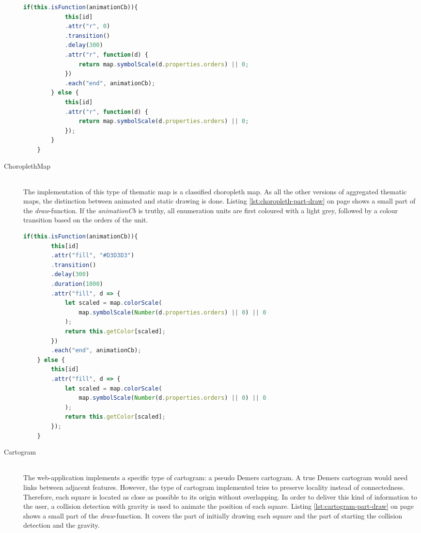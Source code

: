 \begin{description}
\begin{lstlisting}[language=JavaScript, caption={The draw-function of the ProportionalSymbolMap-class}, label={lst:psm-draw}]
        if(this.isFunction(animationCb)){
            this[id]
            .attr("r", 0)
            .transition()
            .delay(300)
            .attr("r", function(d) {
                return map.symbolScale(d.properties.orders) || 0;
            })
            .each("end", animationCb);
        } else {
            this[id]
            .attr("r", function(d) {
                return map.symbolScale(d.properties.orders) || 0;
            });
        }
    }
\end{lstlisting}

\item[ChoroplethMap] \hfill \\
The implementation of this type of thematic map is a classified choropleth map. As all the other versions of aggregated thematic maps, the distinction between animated and static drawing is done. Listing \ref{lst:choropleth-part-draw} on page \pageref{lst:choropleth-part-draw} shows a small part of the \textit{draw}-function. If the \textit{animationCb} is truthy, all enumeration units are first coloured with a light grey, followed by a colour transition based on the orders of the unit.

\begin{lstlisting}[language=JavaScript, caption={A small part of the draw-function of the ChoroplethMap-class}, label={lst:choropleth-part-draw}]
    if(this.isFunction(animationCb)){
        this[id]
        .attr("fill", "#D3D3D3")
        .transition()
        .delay(300)
        .duration(1000)
        .attr("fill", d => {
            let scaled = map.colorScale(
                map.symbolScale(Number(d.properties.orders) || 0) || 0
            );
            return this.getColor[scaled];
        })
        .each("end", animationCb);
    } else {
        this[id]
        .attr("fill", d => {
            let scaled = map.colorScale(
                map.symbolScale(Number(d.properties.orders) || 0) || 0
            );
            return this.getColor[scaled];
        });
    }
\end{lstlisting}


\item[Cartogram] \hfill \\
The web-application implements a specific type of cartogram: a pseudo Demers cartogram. A true Demers cartogram would need links between adjacent features. However, the type of cartogram implemented tries to preserve locality instead of connectedness. Therefore, each square is located as close as possible to its origin without overlapping. In order to deliver this kind of information to the user, a collision detection with gravity is used to animate the position of each square. Listing \ref{lst:cartogram-part-draw} on page \pageref{lst:cartogram-part-draw} shows a small part of the \textit{draw}-function. It covers the part of initially drawing each square and the part of starting the collision detection and the gravity.


\end{description}
